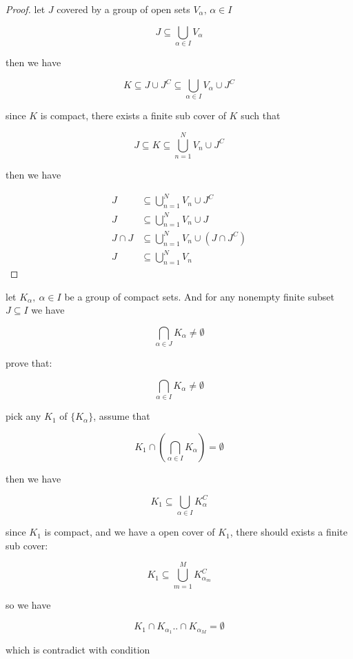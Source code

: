 \begin{proof}
    let $J$ covered by a group of open sets $V_{\alpha},\, \alpha \in I$

    \[
        J \subseteq \bigcup_{\alpha \in I} V_{\alpha}
    \]

    then we have

    \[
        K \subseteq J \cup J^C \subseteq \bigcup_{\alpha \in I} V_{\alpha} \cup J^C
    \]

    since $K$ is compact, there exists a finite sub cover of $K$ such that

    \[
        J \subseteq K \subseteq \bigcup_{n=1}^{N} V_{n} \cup J^C
    \]

    then we have

    \begin{align*}
        J & \subseteq \bigcup_{n=1}^{N} V_{n} \cup J^C \\
        J & \subseteq \bigcup_{n=1}^{N} V_{n} \cup J \\
        J \cap J & \subseteq \bigcup_{n=1}^{N} V_{n} \cup (J \cap J^C) \\
        J & \subseteq \bigcup_{n=1}^{N} V_{n}
    \end{align*}

\end{proof}

\begin{exercise}
    let $K_{\alpha},\: \alpha \in I$ be a group of compact sets. And for any nonempty finite subset $J \subseteq I$ we have

    \[
        \bigcap_{\alpha \in J} K_{\alpha} \ne \emptyset
    \]

    prove that:

    \[
        \bigcap_{\alpha \in I} K_{\alpha} \ne \emptyset
    \]

    pick any $K_1$ of  $\{ K_{\alpha}\}$, assume that

    \[
        K_1 \cap \left( \bigcap_{\alpha \in I} K_{\alpha} \right) = \emptyset
    \]

    then we have

    \[
        K_1 \subseteq \bigcup_{\alpha \in I}K_{\alpha}^C
    \]

    since $K_1$ is compact, and we have a open cover of $K_1$, there should exists a finite sub cover:

    \[
        K_1 \subseteq \bigcup_{m=1}^{M}K_{\alpha_m}^C
    \]

    so we have

    \[
        K_1 \cap K_{\alpha_1} .. \cap K_{\alpha_M} = \emptyset
    \]

    which is contradict with condition
\end{exercise}

